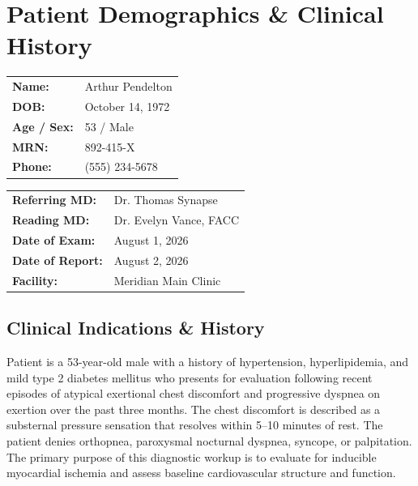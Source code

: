 \section{Patient Demographics \& Clinical History}

\noindent
\begin{minipage}[t]{0.48\textwidth}
    \begin{tcolorbox}[cardiologybox, title=Patient Information]
        \begin{tabular}{ll}
            \textbf{Name:} & Arthur Pendelton \\
            \textbf{DOB:} & October 14, 1972 \\
            \textbf{Age / Sex:} & 53 / Male \\
            \textbf{MRN:} & 892-415-X \\
            \textbf{Phone:} & (555) 234-5678
        \end{tabular}
    \end{tcolorbox}
\end{minipage}
\hfill
\begin{minipage}[t]{0.48\textwidth}
    \begin{tcolorbox}[cardiologybox, title=Clinical Metadata]
        \begin{tabular}{ll}
            \textbf{Referring MD:} & Dr. Thomas Synapse \\
            \textbf{Reading MD:} & Dr. Evelyn Vance, FACC \\
            \textbf{Date of Exam:} & August 1, 2026 \\
            \textbf{Date of Report:} & August 2, 2026 \\
            \textbf{Facility:} & Meridian Main Clinic
        \end{tabular}
    \end{tcolorbox}
\end{minipage}

\vspace{0.4cm}

\subsection{Clinical Indications \& History}
Patient is a 53-year-old male with a history of hypertension, hyperlipidemia, and mild type 2 diabetes mellitus who presents for evaluation following recent episodes of atypical exertional chest discomfort and progressive dyspnea on exertion over the past three months. The chest discomfort is described as a substernal pressure sensation that resolves within 5--10 minutes of rest. The patient denies orthopnea, paroxysmal nocturnal dyspnea, syncope, or palpitation. The primary purpose of this diagnostic workup is to evaluate for inducible myocardial ischemia and assess baseline cardiovascular structure and function.
